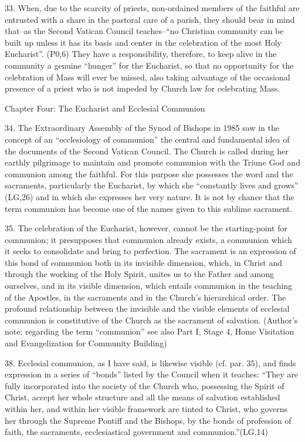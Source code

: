 \documentclass[oneside]{book}
\begin{document}
33. When, due to the scarcity of priests, non-ordained members of the faithful
are entrusted with a share in the pastoral care of a parish, they should bear in
mind that--as the Second Vatican Council teaches--``no Christian community can
be built up unless it has its basis and center in the celebration of the most
Holy Eucharist''. (P0,6) They have a responsibility, therefore, to keep alive in
the community a genuine ``hunger'' for the Eucharist, so that no opportunity for
the celebration of Mass will ever be missed, also taking advantage of the
occasional presence of a priest who is not impeded by Church law for celebrating
Mass.

Chapter Four: The Eucharist and Ecclesial Communion

34. The Extraordinary Assembly of the Synod of Bishops in 1985 saw in the
concept of an ``ecclesiology of communion'' the central and fundamental idea of
the documents of the Second Vatican Council. The Church is called during her
earthly pilgrimage to maintain and promote communion with the Triune God and
communion among the faithful. For this purpose she possesses the word and the
sacraments, particularly the Eucharist, by which she ``constantly lives and
grows'' (LG,26) and in which she expresses her very nature. It is not by chance
that the term communion has become one of the names given to this sublime
sacrament.

35. The celebration of the Eucharist, however, cannot be the starting-point for
communion; it presupposes that communion already exists, a communion which it
seeks to consolidate and bring to perfection. The sacrament is an expression of
this bond of communion both in its invisible dimension, which, in Christ and
through the working of the Holy Spirit, unites us to the Father and among
ourselves, and in its visible dimension, which entails communion in the teaching
of the Apostles, in the sacraments and in the Church's hierarchical order. The
profound relationship between the invisible and the visible elements of
ecclesial communion is constitutive of the Church as the sacrament of
salvation. (Author's note: regarding the term ``communion'' see also Part I,
Stage 4, Home Visitation and Evangelization for Community Building)

38. Ecclesial communion, as I have said, is likewise visible (cf. par. 35), and
finds expression in a series of ``bonds'' listed by the Council when it teaches:
``They are fully incorporated into the society of the Church who, possessing the
Spirit of Christ, accept her whole structure and all the means of salvation
established within her, and within her visible framework are tinted to Christ,
who governs her through the Supreme Pontiff and the Bishops, by the bonds of
profession of faith, the sacraments, ecclesiastical government and communion.''(LG,14)
\end{document}

